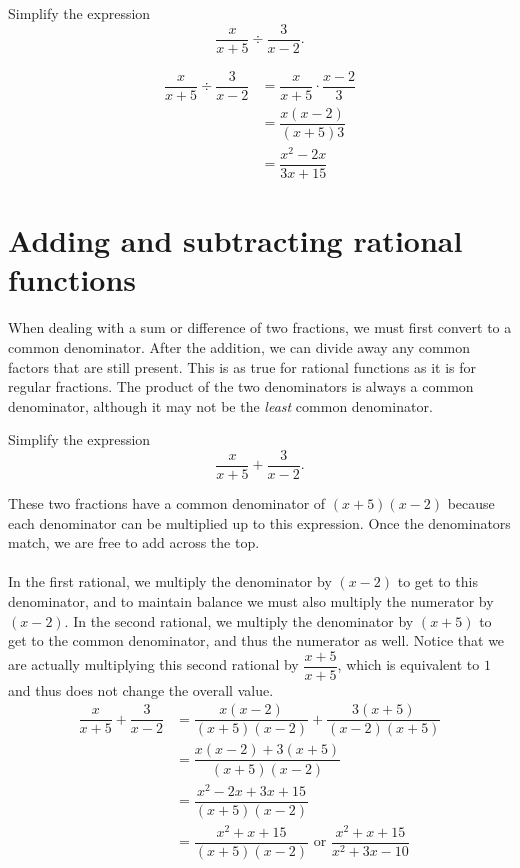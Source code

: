 \documentclass{ximera}
\begin{document}
\begin{example}
	Simplify the expression \[ \dfrac{x}{x+5}\div\dfrac{3}{x-2}. \]
	\begin{explanation}
		\begin{align*}
			\dfrac{x}{x+5}\div\dfrac{3}{x-2} &= \dfrac{x}{x+5}\cdot\dfrac{x-2}{3}\\
				&= \dfrac{x(x-2)}{(x+5)3}\\
				&= \dfrac{x^2-2x}{3x+15}
		\end{align*}
	\end{explanation}
\end{example}


\section{Adding and subtracting rational functions}

When dealing with a sum or difference of two fractions, we must first convert to a common denominator.  After the addition, we can divide away any common factors that are still present. This is as true for rational functions as it is for regular fractions. The product of the two denominators is always a common denominator, although it may not be the \emph{least} common denominator.

\begin{example}
	Simplify the expression \[ \dfrac{x}{x+5} + \dfrac{3}{x-2}. \]
	\begin{explanation}
		These two fractions have a common denominator of $(x+5)(x-2)$ because each denominator can be multiplied up to this expression. Once the denominators match, we are free to add across the top.
\\\\In the first rational, we multiply the denominator by $(x-2)$ to get to this denominator, and to maintain balance we must also multiply the numerator by $(x-2)$. In the second rational, we multiply the denominator by $(x+5)$ to get to the common denominator, and thus the numerator as well. Notice that we are actually multiplying this second rational by $\dfrac{x+5}{x+5}$, which is equivalent to $1$ and thus does not change the overall value.
		\begin{align*}
			\dfrac{x}{x+5} + \dfrac{3}{x-2} &= \dfrac{x(x-2)}{(x+5)(x-2)} + \dfrac{3(x+5)}{(x-2)(x+5)}\\
				&= \dfrac{x(x-2)+3(x+5)}{(x+5)(x-2)}\\
				&= \dfrac{x^2-2x+3x+15}{(x+5)(x-2)}\\ 
				&= \dfrac{x^2+x+15}{(x+5)(x-2)} \mbox{ or } \dfrac{x^2+x+15}{x^2+3x-10}
		\end{align*}
	\end{explanation}
\end{example}
\end{document}
